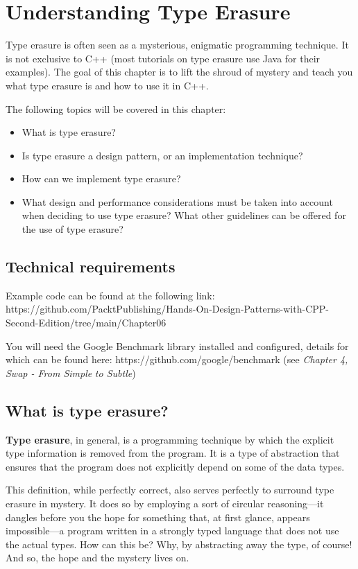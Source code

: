 ﻿\chapter{Understanding Type Erasure}

Type erasure is often seen as a mysterious, enigmatic programming technique. It is not exclusive to C++ (most tutorials on type erasure use Java for their examples). The goal of this chapter is to lift the shroud of mystery and teach you what type erasure is and how to use it in C++.

The following topics will be covered in this chapter:

\begin{itemize}
\item
  What is type erasure?
\item
  Is type erasure a design pattern, or an implementation technique?
\item
  How can we implement type erasure?
\item
  What design and performance considerations must be taken into account when deciding to use type erasure? What other guidelines can be offered for the use of type erasure?
\end{itemize}

\section{Technical requirements}

Example code can be found at the following link: https://github.com/PacktPublishing/Hands-On-Design-Patterns-with-CPP-Second-Edition/tree/main/Chapter06

You will need the Google Benchmark library installed and configured, details for which can be found here: https://github.com/google/benchmark (see \emph{Chapter 4, Swap - From Simple} \emph{to Subtle})

\section{What is type erasure?}

\textbf{Type erasure}, in general, is a programming technique by which the explicit type information is removed from the program. It is a type of abstraction that ensures that the program does not explicitly depend on some of the data types.

This definition, while perfectly correct, also serves perfectly to surround type erasure in mystery. It does so by employing a sort of circular reasoning---it dangles before you the hope for something that, at first glance, appears impossible---a program written in a strongly typed language that does not use the actual types. How can this be? Why, by abstracting away the type, of course! And so, the hope and the mystery lives on.

